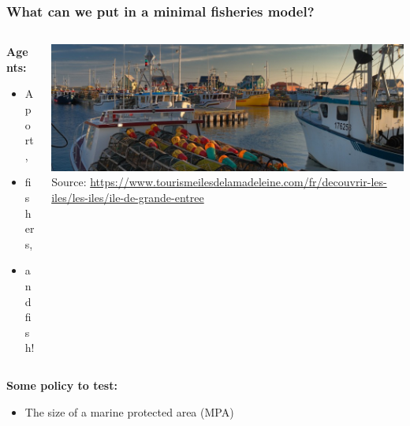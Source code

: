 \documentclass[table, 14pt, aspectratio=169]{beamer}
\newcommand{\hl}[1]{\textcolor{OxfordBlue}{\textbf{#1}}}
\begin{document}
\begin{frame}[t]
\begin{columns}[T]
\begin{column}{0.425\textwidth}
    \end{column}
  \end{columns}
\end{frame}


\begin{frame}[t]\frametitle{What can we put in a minimal fisheries model?}
  \Large
  \vfill
  \begin{columns}[T]
    \begin{column}{0.3\textwidth}
      \hl{Agents:}
      \begin{itemize}
        \item A port,
        \item fishers,
        \item and fish!
      \end{itemize}
    \end{column}
    \begin{column}{0.6\textwidth}
      \includegraphics[width=\textwidth]{images/port.jpg}\\
      \tiny Source: \url{https://www.tourismeilesdelamadeleine.com/fr/decouvrir-les-iles/les-iles/ile-de-grande-entree}
    \end{column}
  \end{columns}
  \vfill
      \hl{Some policy to test:}
      \begin{itemize}
        \item The size of a marine protected area (MPA)
      \end{itemize}
\end{frame}
\end{document}
